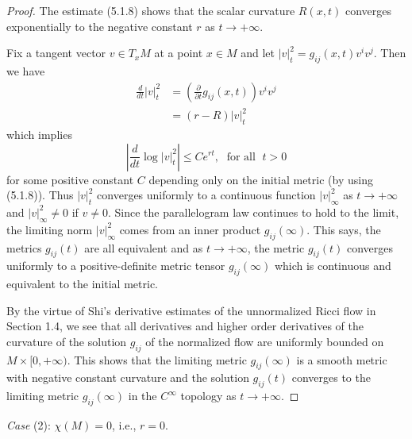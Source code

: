 \begin{proof}
The estimate (5.1.8) shows that the scalar curvature $R(x,t)$
converges exponentially to the negative constant $r$ as
$t\rightarrow+\infty$.

Fix a tangent vector $v\in T_xM$ at a point $x\in M$ and let
$|v|^2_t=g_{ij}(x,t)v^iv^j$. Then we have
\begin{align*}
\frac{d}{dt}|v|_t^2
&  =\left(\frac{\partial}{\partial t}g_{ij}(x,t)\right)v^iv^j\\
&  = (r-R)|v|_t^2
\end{align*}
which implies
$$
\left|\frac{d}{dt}\log|v|_t^2\right| \leq Ce^{rt}, \; \text{ for
all } \; t>0
$$
for some positive constant $C$ depending only on the initial
metric (by using (5.1.8)). Thus $|v|_t^2$ converges uniformly to a
continuous function $|v|_{\infty}^2$ as $t\rightarrow +\infty$ and
$|v|_{\infty}^2\neq 0$ if $v\neq 0$. Since the parallelogram law
continues to hold to the limit, the limiting norm $|v|_{\infty}^2$
comes from an inner product $g_{ij}(\infty)$. This says, the
metrics $g_{ij}(t)$ are all equivalent and as $t\rightarrow
+\infty$, the metric $g_{ij}(t)$ converges uniformly to a
positive-definite metric tensor $g_{ij}(\infty)$ which is
continuous and equivalent to the initial metric.

By the virtue of Shi's derivative estimates of the unnormalized
Ricci flow in Section 1.4, we see that all derivatives and higher
order derivatives of the curvature of the solution $g_{ij}$ of the
normalized flow are uniformly bounded on $M\times [0,+\infty)$.
This shows that the limiting metric $g_{ij}(\infty)$ is a smooth
metric with negative constant curvature and the solution
$g_{ij}(t)$ converges to the limiting metric $g_{ij}(\infty)$ in
the $C^{\infty}$ topology as $t\rightarrow +\infty$.
\end{proof}

\smallskip
{\it Case} (2): $\chi(M)=0$, i.e., $r=0$.

